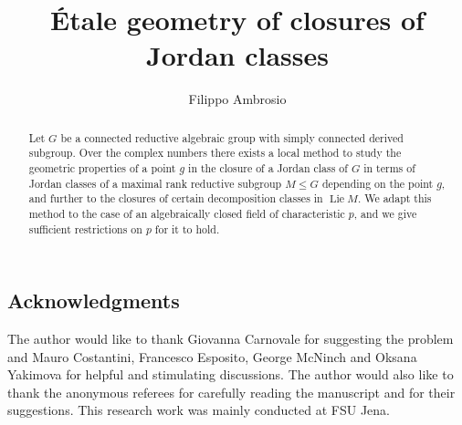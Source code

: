 \documentclass[12pt]{amsart}
\title[\'Etale geometry of closures of Jordan classes]{\'Etale geometry of closures of Jordan classes}
\author[F. Ambrosio]{Filippo Ambrosio}
\theoremstyle{definition}
\theoremstyle{remark}
\newcommand{\Lie}{\operatorname{Lie}}
\begin{document}
\begin{abstract}
Let $G$ be a connected reductive algebraic group with  simply connected derived subgroup.
Over the complex numbers there exists a local method to study the geometric properties of a point $g$ in the closure of a Jordan class of $G$ in terms of Jordan classes of a maximal rank reductive subgroup $M \leq G$ depending on the point $g$, and further to the closures of certain decomposition classes in $\Lie M$.
We adapt this method to the case of an algebraically closed field of characteristic $p$, and we give sufficient restrictions on $p$ for it to hold.
\end{abstract}

\maketitle


\subsection*{Acknowledgments}
The author would like to thank Giovanna Carnovale for suggesting the problem and Mauro Costantini, Francesco Esposito, George McNinch and Oksana Yakimova for helpful and stimulating discussions.
The author would also like to thank the anonymous referees for carefully reading the manuscript and for their suggestions.
This research work was mainly conducted at FSU Jena. 


\end{document}
